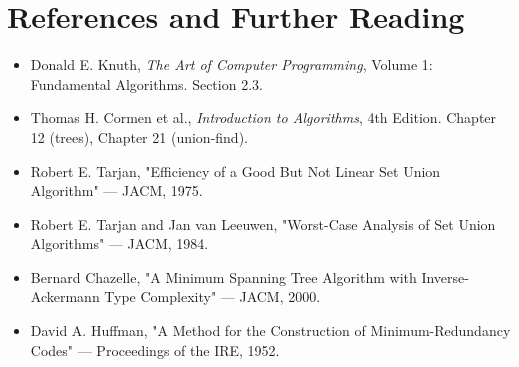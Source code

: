 \section{References and Further Reading}

\begin{itemize}
\item Donald E. Knuth, \textit{The Art of Computer Programming}, Volume 1: Fundamental Algorithms. Section 2.3.
\item Thomas H. Cormen et al., \textit{Introduction to Algorithms}, 4th Edition. Chapter 12 (trees), Chapter 21 (union-find).
\item Robert E. Tarjan, "Efficiency of a Good But Not Linear Set Union Algorithm" — JACM, 1975.
\item Robert E. Tarjan and Jan van Leeuwen, "Worst-Case Analysis of Set Union Algorithms" — JACM, 1984.
\item Bernard Chazelle, "A Minimum Spanning Tree Algorithm with Inverse-Ackermann Type Complexity" — JACM, 2000.
\item David A. Huffman, "A Method for the Construction of Minimum-Redundancy Codes" — Proceedings of the IRE, 1952.
\end{itemize}

